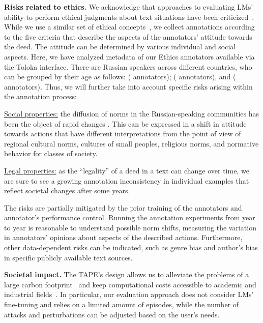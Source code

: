\documentclass[11pt]{article}
\begin{document}
\noindent \textbf{Risks related to ethics.} We acknowledge that approaches to evaluating LMs' ability to perform ethical judgments about text situations have been criticized~\cite{talat-etal-2022-machine}. While we use a similar set of ethical concepts~\cite{hendrycks2021aligning}, we collect annotations according to the five criteria that describe the aspects of the annotators' attitude towards the deed. The attitude can be determined by various individual and social aspects. Here, we have analyzed metadata of our Ethics annotators available via the Toloka interface. There are  Russian speakers across  different countries, who can be grouped by their age as follows:  ( annotators);  ( annotators), and  ( annotators). Thus, we will further take into account specific risks arising within the annotation process:

\noindent \underline{Social properties:} the diffusion of norms in the Russian-speaking communities has been the object of rapid changes \cite{doi:10.1080/13510347.2021.1928078}. This can be expressed in a shift in attitude towards actions that have different interpretations from the point of view of regional cultural norms, cultures of small peoples, religious norms, and normative behavior for classes of society.

\noindent   \underline{Legal properties:} as the ``legality'' of a deed in a text can change over time, we are sure to see a growing annotation inconsistency in individual examples that reflect societal changes after some years.

\noindent The risks are partially mitigated by the prior training of the annotators and annotator's performance control. Running the annotation experiments from year to year is reasonable to understand possible norm shifts, measuring the variation in annotators' opinions about aspects of the described actions. Furthermore, other data-dependent risks can be indicated, such as genre bias and author's bias in specific publicly available text sources.

\noindent \textbf{Societal impact.} The TAPE's design allows us to alleviate the problems of a large carbon footprint~\cite{bender2021dangers} and keep computational costs accessible to academic and industrial fields~\cite{couldry2020costs}. In particular, our evaluation approach does not consider LMs' fine-tuning and relies on a limited amount of episodes, while the number of attacks and perturbations can be adjusted based on the user's needs.  


\end{document}

